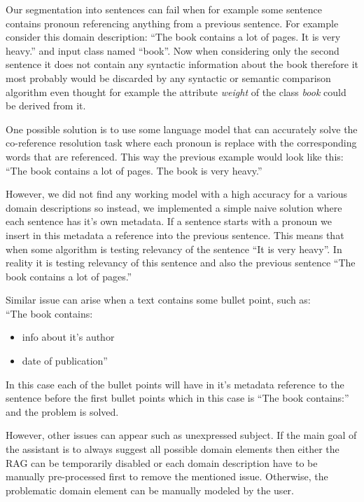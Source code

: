 Our segmentation into sentences can fail when for example some sentence contains pronoun referencing anything from a previous sentence. For example consider this domain description: ``The book contains a lot of pages. It is very heavy.'' and input class named ``book''. Now when considering only the second sentence it does not contain any syntactic information about the book therefore it most probably would be discarded by any syntactic or semantic comparison algorithm even thought for example the attribute \textit{weight} of the class \textit{book} could be derived from it.

One possible solution is to use some language model that can accurately solve the co-reference resolution task where each pronoun is replace with the corresponding words that are referenced. This way the previous example would look like this: ``The book contains a lot of pages. The book is very heavy.''

However, we did not find any working model with a high accuracy for a various domain descriptions so instead, we implemented a simple naive solution where each sentence has it's own metadata. If a sentence starts with a pronoun we insert in this metadata a reference into the previous sentence. This means that when some algorithm is testing relevancy of the sentence ``It is very heavy''. In reality it is testing relevancy of this sentence and also the previous sentence ``The book contains a lot of pages.''

Similar issue can arise when a text contains some bullet point, such as: \\

``The book contains:
\begin{itemize}
\item info about it's author
\item date of publication''
\end{itemize}

In this case each of the bullet points will have in it's metadata reference to the sentence before the first bullet points which in this case is ``The book contains:'' and the problem is solved.

However, other issues can appear such as unexpressed subject. If the main goal of the assistant is to always suggest all possible domain elements then either the RAG can be temporarily disabled or each domain description have to be manually pre-processed first to remove the mentioned issue. Otherwise, the problematic domain element can be manually modeled by the user.